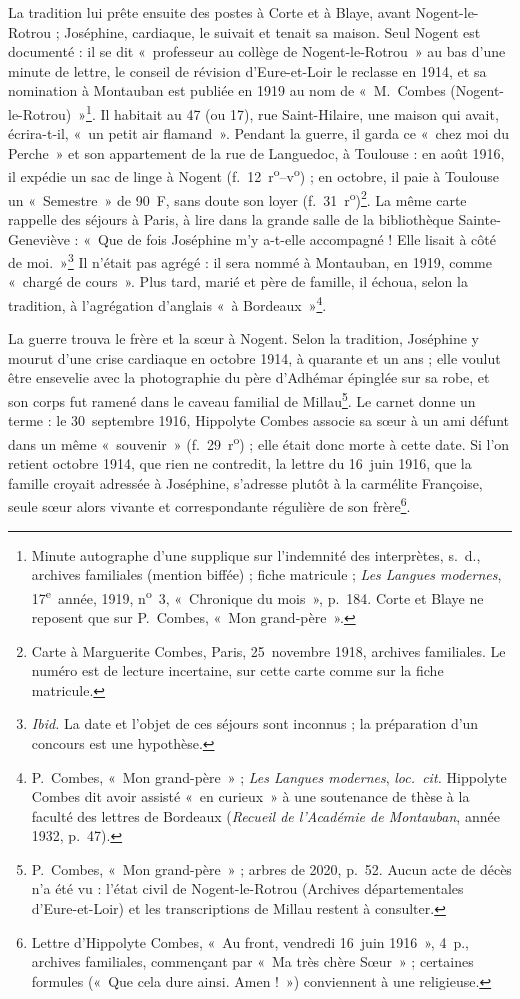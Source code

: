 La tradition lui prête ensuite des postes à Corte et à Blaye, avant Nogent-le-Rotrou ; Joséphine, cardiaque, le suivait et tenait sa maison. Seul Nogent est documenté : il se dit «~professeur au collège de Nogent-le-Rotrou~» au bas d'une minute de lettre, le conseil de révision d'Eure-et-Loir le reclasse en 1914, et sa nomination à Montauban est publiée en 1919 au nom de «~M.~Combes (Nogent-le-Rotrou)~»\footnote{Minute autographe d'une supplique sur l'indemnité des interprètes, s.~d., archives familiales (mention biffée) ; fiche matricule ; \textit{Les Langues modernes}, 17\textsuperscript{e}~année, 1919, n\textsuperscript{o}~3, «~Chronique du mois~», p.~184. Corte et Blaye ne reposent que sur P.~Combes, «~Mon grand-père~».}. Il habitait au 47 (ou 17), rue Saint-Hilaire, une maison qui avait, écrira-t-il, «~un petit air flamand~». Pendant la guerre, il garda ce «~chez moi du Perche~» et son appartement de la rue de Languedoc, à Toulouse : en août 1916, il expédie un sac de linge à Nogent (f.~12~r\textsuperscript{o}--v\textsuperscript{o}) ; en octobre, il paie à Toulouse un «~Semestre~» de 90~F, sans doute son loyer (f.~31~r\textsuperscript{o})\footnote{Carte à Marguerite Combes, Paris, 25~novembre 1918, archives familiales. Le numéro est de lecture incertaine, sur cette carte comme sur la fiche matricule.}. La même carte rappelle des séjours à Paris, à lire dans la grande salle de la bibliothèque Sainte-Geneviève : «~Que de fois Joséphine m'y a-t-elle accompagné ! Elle lisait à côté de moi.~»\footnote{\textit{Ibid.} La date et l'objet de ces séjours sont inconnus ; la préparation d'un concours est une hypothèse.} Il n'était pas agrégé : il sera nommé à Montauban, en 1919, comme «~chargé de cours~». Plus tard, marié et père de famille, il échoua, selon la tradition, à l'agrégation d'anglais «~à Bordeaux~»\footnote{P.~Combes, «~Mon grand-père~» ; \textit{Les Langues modernes}, \textit{loc.~cit.} Hippolyte Combes dit avoir assisté «~en curieux~» à une soutenance de thèse à la faculté des lettres de Bordeaux (\textit{Recueil de l'Académie de Montauban}, année 1932, p.~47).}.

La guerre trouva le frère et la sœur à Nogent. Selon la tradition, Joséphine y mourut d'une crise cardiaque en octobre 1914, à quarante et un ans ; elle voulut être ensevelie avec la photographie du père d'Adhémar épinglée sur sa robe, et son corps fut ramené dans le caveau familial de Millau\footnote{P.~Combes, «~Mon grand-père~» ; arbres de 2020, p.~52. Aucun acte de décès n'a été vu : l'état civil de Nogent-le-Rotrou (Archives départementales d'Eure-et-Loir) et les transcriptions de Millau restent à consulter.}. Le carnet donne un terme : le 30~septembre 1916, Hippolyte Combes associe sa sœur à un ami défunt dans un même «~souvenir~» (f.~29~r\textsuperscript{o}) ; elle était donc morte à cette date. Si l'on retient octobre 1914, que rien ne contredit, la lettre du 16~juin 1916, que la famille croyait adressée à Joséphine, s'adresse plutôt à la carmélite Françoise, seule sœur alors vivante et correspondante régulière de son frère\footnote{Lettre d'Hippolyte Combes, «~Au front, vendredi 16~juin 1916~», 4~p., archives familiales, commençant par «~Ma très chère Sœur~» ; certaines formules («~Que cela dure ainsi. Amen !~») conviennent à une religieuse.}.

